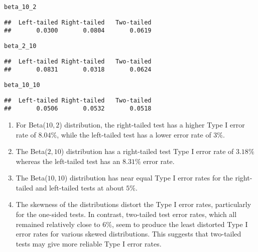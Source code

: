 \documentclass{article}\usepackage[]{graphicx}\usepackage[]{xcolor}
\makeatletter
\newcommand{\hldef}[1]{\textcolor[rgb]{0.345,0.345,0.345}{#1}}%
\newenvironment{kframe}{%
 \def\at@end@of@kframe{}%
 \ifinner\ifhmode%
  \def\at@end@of@kframe{\end{minipage}}%
  \begin{minipage}{\columnwidth}%
 \fi\fi%
 \def\FrameCommand##1{\hskip\@totalleftmargin \hskip-\fboxsep
 \colorbox{shadecolor}{##1}\hskip-\fboxsep
     \hskip-\linewidth \hskip-\@totalleftmargin \hskip\columnwidth}%
 \MakeFramed {\advance\hsize-\width
   \@totalleftmargin\z@ \linewidth\hsize
   \@setminipage}}%
 {\par\unskip\endMakeFramed%
 \at@end@of@kframe}
\newenvironment{knitrout}{}{} %
\makeatother
\begin{document}
\begin{enumerate}
\begin{knitrout}
\begin{kframe}
\begin{alltt}
\hldef{beta_10_2}
\end{alltt}
\begin{verbatim}
##  Left-tailed Right-tailed   Two-tailed 
##       0.0300       0.0804       0.0619
\end{verbatim}
\begin{alltt}
\hldef{beta_2_10}
\end{alltt}
\begin{verbatim}
##  Left-tailed Right-tailed   Two-tailed 
##       0.0831       0.0318       0.0624
\end{verbatim}
\begin{alltt}
\hldef{beta_10_10}
\end{alltt}
\begin{verbatim}
##  Left-tailed Right-tailed   Two-tailed 
##       0.0506       0.0532       0.0518
\end{verbatim}
\end{kframe}
\end{knitrout}
\begin{enumerate}
  \item For Beta($10, 2$) distribution, the right-tailed test has a higher Type I error rate of $8.04\%$, while the left-tailed test has a lower error rate of $3\%$.
  \item The Beta($2, 10$) distribution has a right-tailed test Type I error rate of $3.18\%$ whereas the left-tailed test has an $8.31\%$ error rate.
  \item The Beta($10, 10$) distribution has near equal Type I error rates for the right-tailed and left-tailed tests at about $5\%$.
  \item The skewness of the distributions distort the Type I error rates, particularly for the one-sided tests. In contrast, two-tailed test error rates, which all remained relatively close to $6\%$, seem to produce the least distorted Type I error rates for various skewed distributions. This suggests that two-tailed tests may give more reliable Type I error rates. 
\end{enumerate}
\end{enumerate}

\end{document}

